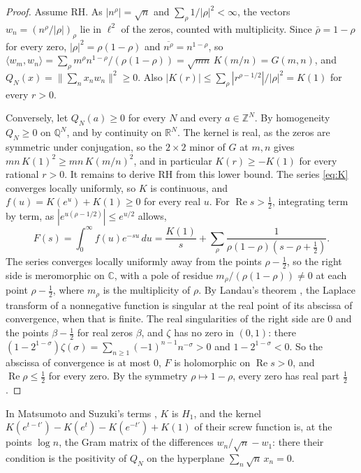 \documentclass[11pt]{article}
\theoremstyle{definition}
\newcommand{\KH}{K}
\begin{document}
\begin{proof}
Assume RH. As $|n^\rho| = \sqrt n$ and $\sum_\rho 1/|\rho|^2 < \infty$, the vectors $w_n = (n^\rho/|\rho|)_\rho$ lie in
$\ell^2$ of the zeros, counted with multiplicity. Since $\bar\rho = 1 - \rho$ for every zero, $|\rho|^2 = \rho(1 -
\rho)$ and $\overline{n^\rho} = n^{1 - \rho}$, so $\langle w_m, w_n\rangle = \sum_\rho m^\rho n^{1 - \rho}/(\rho(1 -
\rho)) = \sqrt{mn}\,\KH(m/n) = G(m, n)$, and $Q_N(x) = \|\sum_n x_n w_n\|^2 \ge 0$. Also $|\KH(r)| \le \sum_\rho
|r^{\rho - 1/2}|/|\rho|^2 = \KH(1)$ for every $r > 0$.

Conversely, let $Q_N(a) \ge 0$ for every $N$ and every $a \in \mathbb Z^N$. By homogeneity $Q_N \ge 0$ on $\mathbb
Q^N$, and by continuity on $\mathbb R^N$. The kernel is real, as the zeros are symmetric under conjugation, so the $2
\times 2$ minor of $G$ at $m, n$ gives $mn\,\KH(1)^2 \ge mn\,\KH(m/n)^2$, and in particular $\KH(r) \ge -\KH(1)$ for
every rational $r > 0$. It remains to derive RH from this lower bound. The series \eqref{eq:K} converges locally
uniformly, so $\KH$ is continuous, and $f(u) = \KH(e^u) + \KH(1) \ge 0$ for every real $u$. For $\operatorname{Re} s >
\frac12$, integrating term by term, as $|e^{u(\rho - 1/2)}| \le
e^{u/2}$ allows,
\[
F(s) = \int_0^\infty f(u) e^{-su}\,du = \frac{\KH(1)}{s} + \sum_\rho \frac{1}{\rho(1 - \rho)(s - \rho + \frac12)}.
\]
The series converges locally uniformly away from the points $\rho - \frac12$, so the right side is meromorphic on
$\mathbb C$, with a pole of residue $m_\rho/(\rho(1 - \rho)) \ne 0$ at each point $\rho - \frac12$, where $m_\rho$ is
the multiplicity of $\rho$. By Landau's theorem \cite[Lemma~15.1]{montgomery-vaughan}, the Laplace transform of a
nonnegative function is singular at the real point of its abscissa of convergence, when that is finite. The real
singularities of the right side are $0$ and the points $\beta - \frac12$ for real zeros $\beta$, and $\zeta$ has no
zero in $(0, 1)$: there $(1 - 2^{1 - \sigma})\zeta(\sigma) =
\sum_{n \ge 1} (-1)^{n - 1} n^{-\sigma} > 0$ and $1 - 2^{1 -
\sigma} < 0$. So the abscissa of convergence is at most $0$, $F$ is holomorphic on $\operatorname{Re} s > 0$, and
$\operatorname{Re} \rho \le \frac12$ for every zero. By the symmetry $\rho \mapsto 1 - \rho$, every zero has real part
$\frac12$.
\end{proof}

In Matsumoto and Suzuki's terms \cite{matsumoto-suzuki}, $\KH$ is $H_1$, and the kernel $\KH(e^{t - t'}) - \KH(e^t) -
\KH(e^{-t'}) + \KH(1)$ of their screw function is, at the points
$\log n$, the Gram matrix of the differences $w_n/\sqrt n
- w_1$: there their condition is the positivity of $Q_N$ on the hyperplane $\sum_n \sqrt n\, x_n = 0$.
\end{document}

